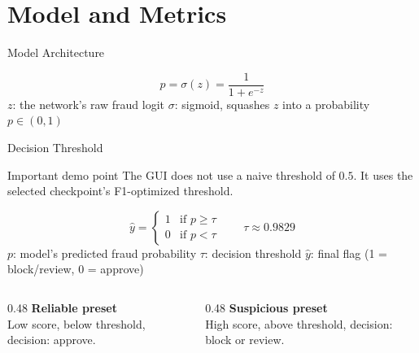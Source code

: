 \documentclass[aspectratio=169,10pt]{beamer}
\newcommand{\bestThreshold}{0.9829}
\begin{document}
\section{Model and Metrics}

\begin{frame}{Model Architecture}
  \centering
  \vspace{0.4cm}
  \[
    p = \sigma(z) = \frac{1}{1 + e^{-z}}
  \]
  \footnotesize \(z\): the network's raw fraud logit \quad \(\sigma\): sigmoid, squashes \(z\) into a probability \(p \in (0,1)\)
\end{frame}

\begin{frame}{Decision Threshold}
  \begin{block}{Important demo point}
    The GUI does not use a naive threshold of \(0.5\). It uses the selected checkpoint's F1-optimized threshold.
  \end{block}
  \[
    \hat{y} =
    \begin{cases}
      1 & \text{if } p \geq \tau \\
      0 & \text{if } p < \tau
    \end{cases}
    \qquad
    \tau \approx \bestThreshold
  \]
  \footnotesize \(p\): model's predicted fraud probability \quad \(\tau\): decision threshold \quad \(\hat{y}\): final flag (1 = block/review, 0 = approve)
  \normalsize
  \begin{columns}[T]
    \begin{column}{0.48\textwidth}
      \textbf{Reliable preset}\\
      Low score, below threshold, decision: approve.
    \end{column}
    \begin{column}{0.48\textwidth}
      \textbf{Suspicious preset}\\
      High score, above threshold, decision: block or review.
    \end{column}
  \end{columns}
\end{frame}
\end{document}

